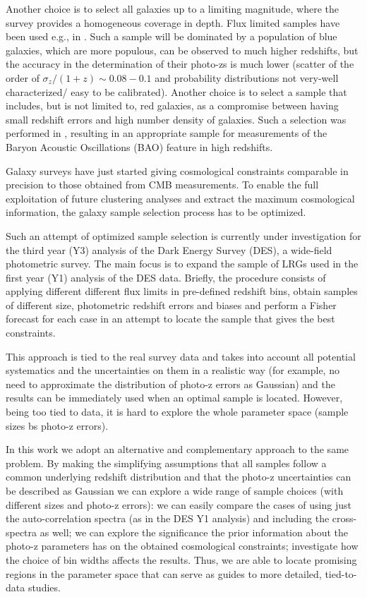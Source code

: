 \documentclass[a4paper,fleqn,usenatbib]{mnras}
\begin{document}
Another choice is to select all galaxies up to a limiting magnitude, where the survey provides a homogeneous coverage in depth. Flux limited samples have been used e.g.,  in \citealt{Crocce2016,Balaguera2018}. Such a sample will be dominated by a population of blue galaxies, which are more populous, can be observed to much higher redshifts, but the accuracy in the determination of their photo-zs is much lower (scatter of the order of $\sigma_{z}/(1 + z) \sim 0.08-0.1$ and  probability distributions not very-well characterized/ easy to be calibrated).  Another choice is to select a sample that includes, but is not limited to, red galaxies, as a compromise between having small redshift errors and high number density of galaxies. Such a selection was performed in \citep{Crocce2017} , resulting in an appropriate sample for measurements of the Baryon Acoustic Oscillations (BAO) feature in high redshifts.

Galaxy surveys have just started giving cosmological constraints comparable in precision to those obtained from CMB measurements. To enable the full exploitation of future clustering analyses and extract the maximum cosmological information, the galaxy sample selection process has to be optimized.  

Such an attempt of optimized sample selection is currently under investigation for the third year (Y3) analysis of the Dark Energy Survey (DES), a wide-field photometric survey. The main focus is to expand the sample of LRGs used in the first year (Y1) analysis of the DES data. Briefly, the procedure consists of applying different different flux limits in pre-defined redshift bins, obtain samples of different size, photometric redshift errors and biases and perform a Fisher forecast for each case in an attempt to  locate the sample that gives the best constraints.
 
This approach is tied to the real survey data and takes into account all potential systematics and the uncertainties on them in a realistic way (for example, no need to approximate the distribution of photo-z errors as Gaussian) and the results can be immediately used when an optimal sample is located. However, being too tied to data, it is hard to explore the  whole parameter space (sample sizes bs photo-z errors).

In this work we adopt an alternative and complementary approach to the same problem. By making the simplifying assumptions that all samples follow a common underlying redshift distribution and that the photo-z uncertainties can be described as  Gaussian we can explore a wide range of sample choices (with different sizes and photo-z errors): we can easily compare the cases of using just the auto-correlation spectra (as in the DES Y1 analysis) and including the cross-spectra as well; we can explore the significance the prior information about the photo-z parameters has on the obtained cosmological constraints; investigate  how the choice of bin widths affects the results. Thus, we are able to locate  promising regions in the parameter space that can serve as guides to more detailed, tied-to-data studies. 
\end{document}
